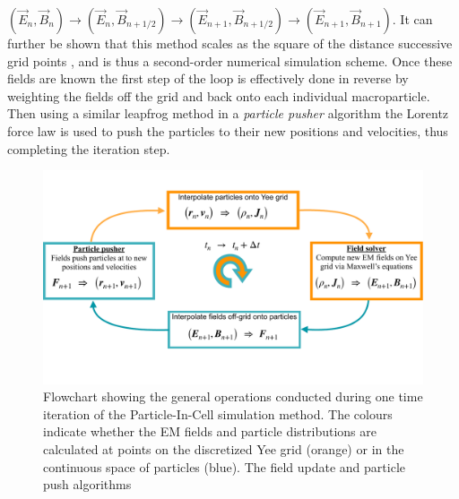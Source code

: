 $\left(\vec{E}_n,\vec{B}_n\right) \to (\vec{E}_n,\vec{B}_{n+1/2}) \to (\vec{E}_{n+1},\vec{B}_{n+1/2})  \to  (\vec{E}_{n+1},\vec{B}_{n+1})$. It can further be shown that this method scales as the square of the distance successive grid points \cite{Lawrence-Douglas2013}, and is thus a second-order numerical simulation scheme. Once these fields are known the first step of the loop is effectively done in reverse by weighting the fields off the grid and back onto each individual macroparticle. Then using a similar leapfrog method in a \textit{particle pusher} algorithm the Lorentz force law is used to push the particles to their new positions and velocities, thus completing the iteration step. 
\begin{figure}
\centering
\includegraphics[width=\textwidth]{PIC_loop2.pdf}
\caption{Flowchart showing the general operations conducted during one time iteration of the Particle-In-Cell simulation method. The colours indicate whether the EM fields and particle distributions are calculated at points on the discretized Yee grid (orange) or in the continuous space of particles (blue). The field update and particle push algorithms}
\label{PIC_loop}
\end{figure}


